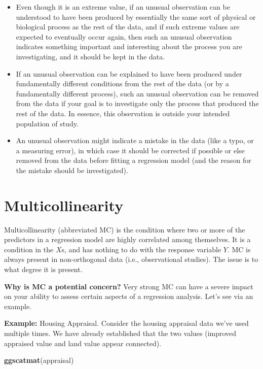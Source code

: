 \documentclass[
]{book}
\newenvironment{Shaded}{\begin{snugshade}}{\end{snugshade}}
\newcommand{\FunctionTok}[1]{\textcolor[rgb]{0.13,0.29,0.53}{\textbf{#1}}}
\newcommand{\NormalTok}[1]{#1}
\begin{document}
\begin{itemize}
\item
  Even though it is an extreme value, if an unusual observation can be understood to have been produced by essentially the same sort of physical or biological process as the rest of the data, and if such extreme values are expected to eventually occur again, then such an unusual observation indicates something important and interesting about the process you are investigating, and it should be kept in the data.
\item
  If an unusual observation can be explained to have been produced under fundamentally different conditions from the rest of the data (or by a fundamentally different process), such an unusual observation can be removed from the data if your goal is to investigate only the process that produced the rest of the data. In essence, this observation is outside your intended population of study.
\item
  An unusual observation might indicate a mistake in the data (like a typo, or a measuring error), in which case it should be corrected if possible or else removed from the data before fitting a regression model (and the reason for the mistake should be investigated).
\end{itemize}

\hypertarget{multicollinearity}{%
\section{Multicollinearity}\label{multicollinearity}}

Multicollinearity (abbreviated MC) is the condition where two or more of the predictors in a regression model are highly correlated among themselves. It is a condition in the \(X\)s, and has nothing to do with the response variable \(Y\). MC is always present in non-orthogonal data (i.e., observational studies). The issue is to what degree it is present.

\textbf{Why is MC a potential concern?} Very strong MC can have a severe impact on your ability to assess certain aspects of a regression analysis. Let's see via an example.

\textbf{Example:} Housing Appraisal. Consider the housing appraisal data we've used multiple times. We have already established that the two values (improved appraised value and land value appear connected).

\begin{Shaded}
\begin{Highlighting}[]
\FunctionTok{ggscatmat}\NormalTok{(appraisal)}
\end{Highlighting}
\end{Shaded}
\end{document}
